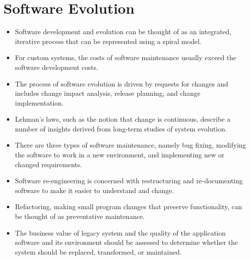 \documentclass{article}
\begin{document}
\section{Software Evolution}
\begin{itemize}
    \item Software development and evolution can be thought of as an integrated, iterative process that can be represented using a spiral model.
    \item For custom systems, the costs of software maintenance usually exceed the software development costs.
    \item The process of software evolution is driven by requests for changes and includes change impact analysis, release planning, and change implementation.
    \item Lehman's laws, such as the notion that change is continuous, describe a number of insights derived from long-term studies of system evolution.
    \item There are three types of software maintenance, namely bug fixing, modifying the software to work in a new environment, and implementing new or changed requirements.
    \item Software re-engineering is concerned with restructuring and re-documenting software to make it easier to understand and change.
    \item Refactoring, making small program changes that preserve functionality, can be thought of as preventative maintenance.
    \item The business value of legacy system and the quality of the application software and its environment should be assessed to determine whether the system should be replaced, transformed, or maintained.
\end{itemize}

\setcounter{section}{10}
\end{document}

